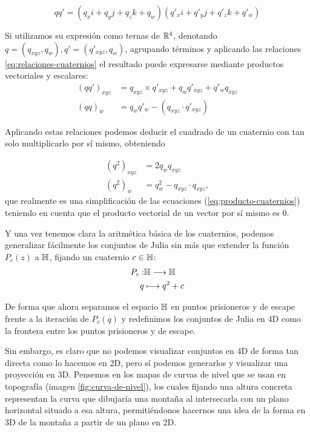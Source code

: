 \begin{equation}
    qq' = (q_x i + q_y j + q_z k + q_w)(q'_x i + q'_y j + q'_z k + q'_w) 
\end{equation}

Si utilizamos su expresión como ternas de $\mathbb{R}^4$, denotando $q=(q_{xyz},q_w), q'=(q'_{xyz},q_w)$, agrupando términos y aplicando las relaciones \ref{eq:relaciones-cuaternios} el resultado puede expresarse mediante productos vectoriales y escalares:
\begin{equation}
    \label{eq:producto-cuaternios}
    \begin{split}
        (qq')_{xyz} &= q_{xyz}\times q'_{xyz} + q_w q'_{xyz} + q'_wq_{xyz} \\
        (qq)_w &= q_wq'_w - (q_{xyz}\cdot q'_{xyz})
    \end{split}
\end{equation}

Aplicando estas relaciones podemos deducir el cuadrado de un cuaternio con tan solo multiplicarlo por sí mismo, obteniendo

\begin{equation}
    \label{eq:cuadrado-cuaternio}
    \begin{split}
        (q^2)_{xyz} &= 2q_w q_{xyz} \\
        (q^2)_w &= q_w^2 - q_{xyz}\cdot q_{xyz},
    \end{split}
\end{equation}
que realmente es una simplificación de las ecuaciones (\ref{eq:producto-cuaternios}) teniendo en cuenta que el producto vectorial de un vector por sí mismo es $0$.

Y una vez tenemos clara la aritmética básica de los cuaternios, podemos generalizar fácilmente los conjuntos de Julia sin más que extender la función $P_c(z)$ a $\mathbb{H}$, fijando un cuaternio $c\in\mathbb{H}$:
\begin{equation}
    \label{eq:f-julia-cuaternios}
    \begin{split}
        P_c :& \mathbb{H} \longrightarrow \mathbb{H} \\
        q & \longmapsto q^2 + c
    \end{split}
\end{equation}

De forma que ahora separamos el espacio $\mathbb{H}$ en puntos prisioneros y de escape frente a la iteración de $P_c(q)$ y redefinimos los conjuntos de Julia en 4D como la frontera entre los puntos prisioneros y de escape. 

Sin embargo, es claro que no podemos visualizar conjuntos en 4D de forma tan directa como lo hacemos en 2D, pero sí podemos generarlos y visualizar una proyección en 3D. Pensemos en los mapas de curvas de nivel que se usan en topografía (imagen \ref{fig:curva-de-nivel}), los cuales fijando una altura concreta representan la curva que dibujaría una montaña al intersecarla con un plano horizontal situado a esa altura, permitiéndonos hacernos una idea de la forma en 3D de la montaña a partir de un plano en 2D. 

